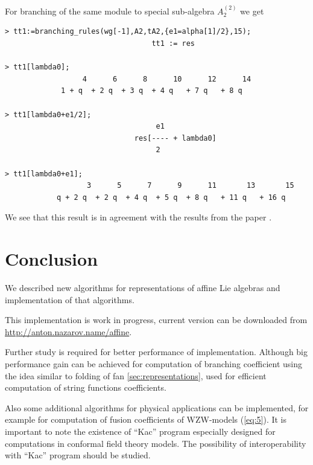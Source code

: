 \documentclass[a4paper,12pt]{article}
\theoremstyle{definition} \newtheorem{Def}{Definition}
\begin{document}
For branching of the same module to special sub-algebra $A_2^{(2)}$ we
get
\begin{verbatim}
> tt1:=branching_rules(wg[-1],A2,tA2,{e1=alpha[1]/2},15);
                                  tt1 := res

> tt1[lambda0];
                  4      6      8      10      12      14
             1 + q  + 2 q  + 3 q  + 4 q   + 7 q   + 8 q

> tt1[lambda0+e1/2];
                                   e1
                              res[---- + lambda0]
                                   2

> tt1[lambda0+e1];
                   3      5      7      9      11       13       15
            q + 2 q  + 2 q  + 4 q  + 5 q  + 8 q   + 11 q   + 16 q
\end{verbatim}
We see that this result is in agreement with the results from the paper \cite{ilyin812pbc}.

\section{Conclusion}
\label{sec:conclusion}
We described new algorithms for representations of affine Lie algebras
and implementation of that algorithms. 

This implementation is work in progress, current version can be
downloaded from \url{http://anton.nazarov.name/affine}.

Further study is required for better performance of implementation.
Although big performance gain can be achieved for computation of
branching coefficient using the idea similar to folding of fan
\ref{sec:representations}, used
for efficient computation of string functions coefficients.

Also some additional algorithms for physical applications can be
implemented, for example for computation of fusion coefficients of
WZW-models (\ref{eq:5}). It is important to note the existence of ``Kac''
program \cite{Fuchs:1996dd} especially designed for computations in conformal field theory
models. The possibility of interoperability with ``Kac'' program
should be studied.  

{}

\end{document}
